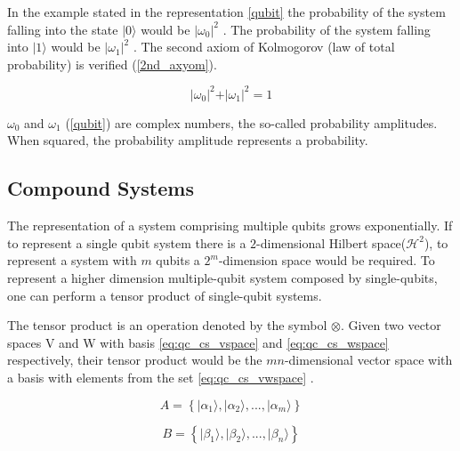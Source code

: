 In the example stated in the representation \ref{qubit} the probability of the system falling into the state $\vert 0 \rangle $ would be $\vert\omega_{0}\vert^{2}$ . The probability of the system falling into $\vert 1 \rangle $ would be $\vert\omega_{1}\vert^{2}$ . The second axiom of Kolmogorov (law of total probability) is verified (\ref{2nd_axyom}).

\begin{equation}
\label{2nd_axyom}
\vert\omega_{0}\vert^{2}+\vert\omega_{1}\vert^{2}=1
\end{equation}

 
$\omega_{0}$ and $\omega_{1}$ (\ref{qubit}) are complex numbers, the so-called probability amplitudes. When squared, the probability amplitude represents a probability. 


\subsection{Compound Systems}
\label{subsec:compound_systems}

The representation of a system comprising multiple qubits grows exponentially. If to represent a single qubit system there is a $2$-dimensional Hilbert space($\mathcal{H}^{2}$), to represent a system with $m$ qubits a $2^m$-dimension space would be required. 
To represent a higher dimension multiple-qubit system composed by single-qubits, one can perform a tensor product of single-qubit systems.

The tensor product is an operation denoted by the symbol $\otimes$. 
Given two vector spaces V and W with basis 
\eqref{eq:qc_cs_vspace} and \eqref{eq:qc_cs_wspace}
respectively, their tensor product would be the $mn$-dimensional vector space with a basis with elements from the set \eqref{eq:qc_cs_vwspace} \cite{Rieffel2011}.


\begin{equation}
\label{eq:qc_cs_vspace}
A = \left\{ \vert \alpha_{1} \rangle, \vert \alpha_{2} \rangle , ..., \vert \alpha_{m} \rangle \right\}
\end{equation} 

\begin{equation} 
\label{eq:qc_cs_wspace}
B = \left\{ \vert \beta_{1} \rangle, \vert \beta_{2} \rangle , ..., \vert \beta_{n} \rangle \right\}
\end{equation} 

